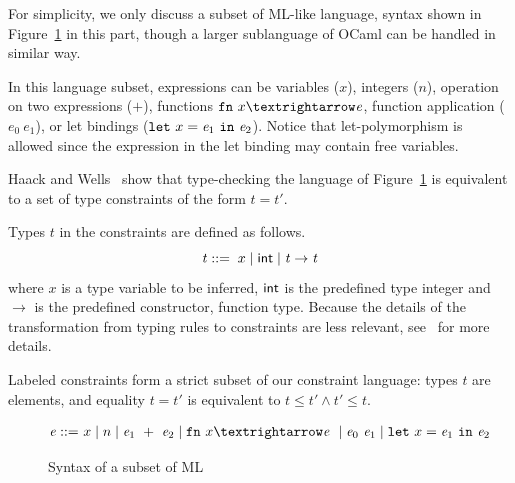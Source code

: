 For simplicity, we only discuss a subset of ML-like language, syntax shown in
Figure~\ref{figure:mltypes} in this part, though a larger sublanguage
of OCaml can be handled in similar way.

\newcommand\expr{\mathit{e}}
\newcommand\ty{\mathit{t}}

In this language subset, expressions can be variables ($x$), integers
($n$), operation on two expressions ($+$), functions $\fn~x→\expr$,
function application ($\expr_0~\expr_1$), or let bindings
($\kwlet x = \expr_1 \kwin \expr_2$). Notice that
let-polymorphism is allowed since the expression in the let binding
may contain free variables.

Haack and Wells~\cite{haack:slicing} show that type-checking the
language of Figure~\ref{figure:mltypes} is equivalent to a set of
type constraints of the form $\ty = \ty'$.

Types $\ty$ in the constraints are defined as follows.
\[\ty ::=\; x \mid \atom{int} \mid \ty \rightarrow \ty\]
\noindent where $x$ is a type variable to be inferred, $\textsf{int}$ is the predefined type integer and
$\rightarrow$ is the predefined constructor, function type. Because
the details of the
transformation from typing rules to constraints
are less relevant, see~\cite{haack:slicing} for more details. 

Labeled constraints form a strict subset of our constraint
language:
types $\ty$ are elements, and equality $\ty=\ty'$ is equivalent to
$\ty\leq \ty' \land \ty'\leq \ty$. 

\begin{figure}
\begin{minipage}{2in}
\begin{align*}
\expr ::=  & x \mid n \mid \expr_1 + \expr_2 \mid \fn x → \expr \mid
\expr_0  \expr_1 \mid \kwlet x =
\expr_1  \kwin  \expr_2
\end{align*}
\end{minipage}
\caption{Syntax of a subset of ML}
\label{figure:mltypes}
\end{figure}


% 

